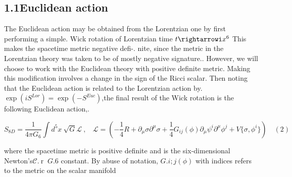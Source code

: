 \documentclass{article}
\begin{document}
\subsection*{1.1Euclidean action}


The Euclidean action may be obtained from the Lorentzian one by first performing a simple.
Wick rotation of Lorentzian time $t \rightarrowi x ^ { 6 }$ This makes the spacetime metric negative defi-.
nite, since the metric in the Lorentzian theory was taken to be of mostly negative signature..
However, we will choose to work with the Euclidean theory with positive definite metric.
Making this modification involves a change in the sign of the Ricci scalar. Then noting that
the Euclidean action is related to the Lorentzian action by. $\exp \left ( i S ^ { L o r } \right ) = \exp \left ( - S ^ { E u c } \right )$,the
final result of the Wick rotation is the following Euclidean action,.


\begin{equation}
S _ { 8 D } = \frac { 1 } { 4 \pi G _ { 6 } } \int d ^ { 5 } x ~ \sqrt { G } \mathcal { L } ~, ~ ~ ~ ~ \mathcal { L } = \left ( - \frac { 1 } { 4 } R + \partial _ { \mu } \sigma \partial ^ { \mu } \sigma + \frac { 1 } { 4 } G _ { i j } ( \phi ) \partial _ { \mu } \psi ^ { i } \partial ^ { \mu } \phi ^ { j } + V \{ \sigma, \phi ^ { i } \} \right ) \quad ( 2 )
\end{equation}


where the spacetime metric is positive definite and is the six-dimensional Newton's$\boldsymbol { \mathcal { C } } . { \mathrm { ~ r ~ } }$ $G . { 6 }$
constant. By abuse of notation, $G . { i ; j } ( \phi )$ with indices refers to the metric on the scalar manifold
\end{document}
